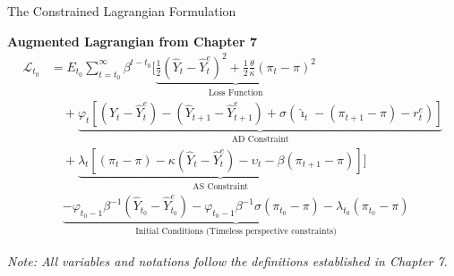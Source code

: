\documentclass[11pt,aspectratio=169]{beamer}
\begin{document}
\begin{frame}{The Constrained Lagrangian Formulation}
\small

\textbf{Augmented Lagrangian from Chapter 7}
\footnotesize
\begin{equation*}
\begin{aligned}
\mathcal{L}_{t_{0}} &= E_{t_{0}} \sum_{t=t_{0}}^{\infty } \beta^{t-t_{0}} \Bigg[ \underbrace{\frac{1}{2}( \hat{Y}_{t}-\hat{Y}_{t}^{e}) ^{2} + \frac{1}{2}\frac{\theta }{\kappa }(\pi _{t}-\pi ) ^{2}}_{\text{Loss Function}} \\
&\quad + \underbrace{\varphi _{t}\left[ (\hat{Y}_{t}-\hat{Y}_{t}^{e})-(\hat{Y}_{t+1}-\hat{Y}_{t+1}^{e})+\sigma ( \hat{\imath}_{t}-(\pi _{t+1}-\pi )-r_{t}^{e}) \right]}_{\text{AD Constraint}} \\
&\quad + \underbrace{\lambda _{t}\left[ (\pi _{t}-\pi )-\kappa (\hat{Y}_{t}-\hat{Y}_{t}^{e})-\upsilon _{t}-\beta (\pi _{t+1}-\pi )\right]}_{\text{AS Constraint}} \Bigg] \\
&\quad \underbrace{-\varphi _{t_{0}-1}\beta ^{-1}(\hat{Y}_{t_{0}}-\hat{Y}_{t_0}^{e})-\varphi _{t_{0}-1}\beta ^{-1}\sigma (\pi _{t_{0}}-\pi )-\lambda _{t_{0}}(\pi _{t_{0}}-\pi )}_{\text{Initial Conditions (Timeless perspective constraints)}}
\end{aligned}
\end{equation*}

\vspace{0.2cm}
\scriptsize
\centering\textit{Note: All variables and notations follow the definitions established in Chapter 7.}
\end{frame}
\end{document}
